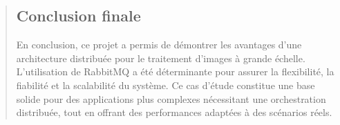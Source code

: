 \documentclass[12pt]{article}
\begin{document}
\begin{quote}
\subsection{Conclusion finale}
En conclusion, ce projet a permis de démontrer les avantages d'une architecture distribuée pour le traitement d'images à grande échelle. L'utilisation de RabbitMQ a été déterminante pour assurer la flexibilité, la fiabilité et la scalabilité du système. Ce cas d'étude constitue une base solide pour des applications plus complexes nécessitant une orchestration distribuée, tout en offrant des performances adaptées à des scénarios réels.
\end{quote}
\end{document}
